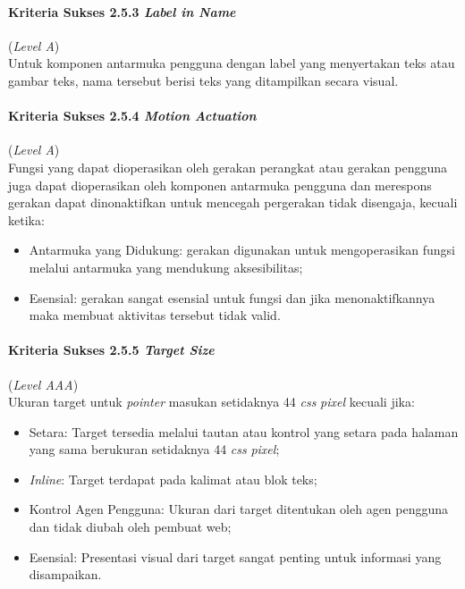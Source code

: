 \paragraph{Kriteria Sukses 2.5.3 \textit{Label in Name}}
\label{subsec:kriteria_2.5.3}
(\textit{Level A}) \\

Untuk komponen antarmuka pengguna dengan label yang menyertakan teks atau gambar teks, nama tersebut berisi teks yang ditampilkan secara visual.

\paragraph{Kriteria Sukses 2.5.4 \textit{Motion Actuation}}
\label{subsec:kriteria_2.5.4}
(\textit{Level A}) \\

Fungsi yang dapat dioperasikan oleh gerakan perangkat atau gerakan pengguna juga dapat dioperasikan oleh komponen antarmuka pengguna dan merespons gerakan dapat dinonaktifkan untuk mencegah pergerakan tidak disengaja, kecuali ketika:

\begin{itemize}
	\item Antarmuka yang Didukung: gerakan digunakan untuk mengoperasikan fungsi melalui antarmuka yang mendukung aksesibilitas;
	\item Esensial: gerakan sangat esensial untuk fungsi dan jika menonaktifkannya maka membuat aktivitas tersebut tidak valid.
\end{itemize}

\paragraph{Kriteria Sukses 2.5.5 \textit{Target Size}}
\label{subsec:kriteria_2.5.5}
(\textit{Level AAA}) \\

Ukuran target untuk \textit{pointer} masukan setidaknya 44 \textit{css} \textit{pixel} kecuali jika:

\begin{itemize}
	\item Setara: Target tersedia melalui tautan atau kontrol yang setara pada halaman yang sama berukuran setidaknya 44 \textit{css} \textit{pixel};
	\item \textit{Inline}: Target terdapat pada kalimat atau blok teks;
	\item Kontrol Agen Pengguna: Ukuran dari target ditentukan oleh agen pengguna dan tidak diubah oleh pembuat web;
	\item Esensial: Presentasi visual dari target sangat penting untuk informasi yang disampaikan.
\end{itemize}


